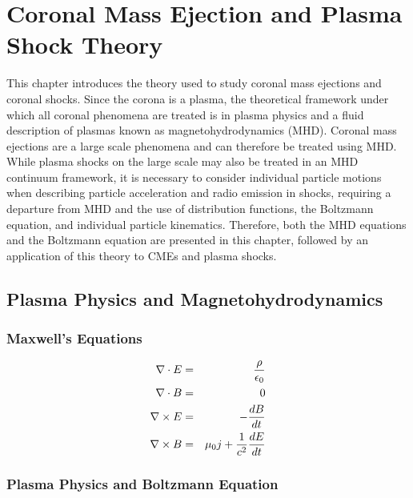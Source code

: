 \chapter{Coronal Mass Ejection and Plasma Shock Theory} 
\label{chap:2}
This chapter introduces the theory used to study coronal mass ejections and coronal shocks. Since the corona is a plasma, the theoretical framework under which all coronal phenomena are treated is in plasma physics and a fluid description of plasmas known as magnetohydrodynamics (MHD). Coronal mass ejections are a large scale phenomena and can therefore be treated using MHD. While plasma shocks on the large scale may also be treated in an MHD continuum framework, it is necessary to consider individual particle motions when describing particle acceleration and radio emission in shocks, requiring a departure from MHD and the use of distribution functions, the Boltzmann equation, and individual particle kinematics. Therefore, both the MHD equations and the Boltzmann equation are presented in this chapter, followed by an application of this theory to CMEs and plasma shocks.


\section{Plasma Physics and Magnetohydrodynamics}\label{sec:1}

\subsection{Maxwell's Equations}\label{sec:10}

\begin{eqnarray}
\nabla \cdot E &=& \frac{\rho}{\epsilon_0} \\
\nabla \cdot B &=& 0 \\
{\bf \nabla} \times{E} &=& - \frac{dB}{dt} \\
{\bf \nabla} \times{B} &=& \mu_0 j + \frac{1}{c^2}\frac{dE}{dt} 
\end{eqnarray}



\subsection{Plasma Physics and Boltzmann Equation}\label{sec:11}


